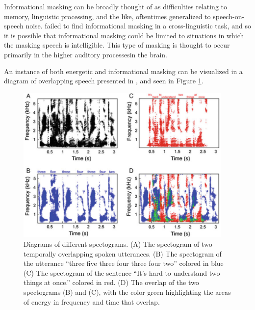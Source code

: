 Informational masking can be broadly thought of as difficulties relating to memory, linguistic processing, and the like, oftentimes generalized to speech-on-speech noise.  \cite{mattys:10} failed to find informational masking in a cross-linguistic task, and so it is possible that informational masking could be limited to situations in which the masking speech is intelligible. This type of masking is thought to occur primarily in the \DIFdelbegin {}\DIFdelend \DIFaddbegin {}\DIFaddend higher auditory processes\DIFdelbegin {}\DIFdelend \DIFaddbegin {}\DIFaddend in the brain.

An instance of both energetic and informational masking can be visualized in a diagram of overlapping speech presented in \cite{middlebrooks:17}, and seen in Figure \ref{fig:sos-masked-spctgrms}.
%
\DIFdelbegin %
\DIFdelend \DIFaddbegin \begin{figure}[h!]
\DIFaddendFL \centering
  \includegraphics[width=0.95\textwidth]{figure/speech-on-speech_masked_spectrograms.png}
  \caption{Diagrams of different spectograms. (A) The spectogram of two temporally overlapping spoken utterances. (B) The spectogram of the utterance ``three five three four three four two'' colored in blue (C) The spectogram of the sentence ``It's hard to understand two things at once.'' colored in red. (D) The overlap of the two spectograms (B) and (C), with the color green highlighting the areas of energy in frequency and time that overlap. }
  \label{fig:sos-masked-spctgrms}
\end{figure}
%
